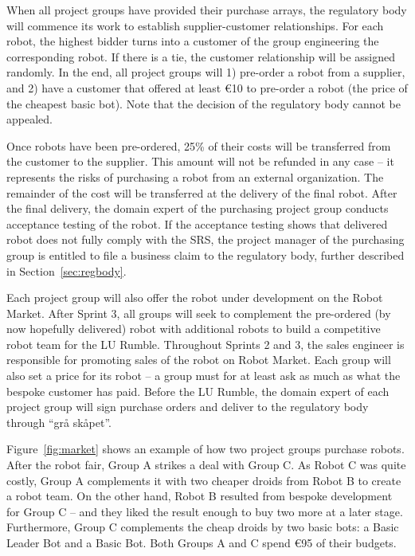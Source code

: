 \documentclass{scrreprt}
\begin{document}
When all project groups have provided their purchase arrays, the regulatory body will commence its work to establish supplier-customer relationships. For each robot, the highest bidder turns into a customer of the group engineering the corresponding robot. If there is a tie, the customer relationship will be assigned randomly. In the end, all project groups will 1) pre-order a robot from a supplier, and 2) have a customer that offered at least \euro 10 to pre-order a robot (the price of the cheapest basic bot). Note that the decision of the regulatory body cannot be appealed. 

Once robots have been pre-ordered, 25\% of their costs will be transferred from the customer to the supplier. This amount will not be refunded in any case -- it represents the risks of purchasing a robot from an external organization. The remainder of the cost will be transferred at the delivery of the final robot. After the final delivery, the domain expert of the purchasing project group conducts acceptance testing of the robot. If the acceptance testing shows that delivered robot does not fully comply with the SRS, the project manager of the purchasing group is entitled to file a business claim to the regulatory body, further described in Section~\ref{sec:regbody}.

Each project group will also offer the robot under development on the Robot Market. After Sprint 3, all groups will seek to complement the pre-ordered (by now hopefully delivered) robot with additional robots to build a competitive robot team for the LU Rumble. Throughout Sprints 2 and 3, the sales engineer is responsible for promoting sales of the robot on Robot Market. Each group will also set a price for its robot -- a group must for at least ask as much as what the bespoke customer has paid. Before the LU Rumble, the domain expert of each project group will sign purchase orders and deliver to the regulatory body through ``grå skåpet''. 

Figure~\ref{fig:market} shows an example of how two project groups purchase robots. After the robot fair, Group A strikes a deal with Group C. As Robot C was quite costly, Group A complements it with two cheaper droids from Robot B to create a robot team. On the other hand, Robot B resulted from bespoke development for Group C -- and they liked the result enough to buy two more at a later stage. Furthermore, Group C complements the cheap droids by two basic bots: a Basic Leader Bot and a Basic Bot. Both Groups A and C spend \euro95 of their budgets.
\end{document}

